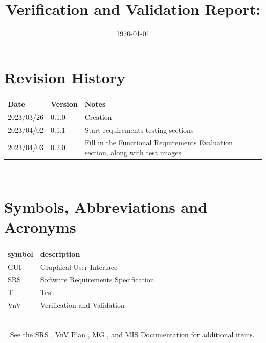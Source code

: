 \documentclass[12pt, titlepage]{article}
\begin{document}
\title{Verification and Validation Report: \progname} 
\author{\authname}
\date{\today}
	
\maketitle


\section{Revision History}

\begin{tabularx}{\textwidth}{p{3cm}p{2cm}X}
\toprule {\bf Date} & {\bf Version} & {\bf Notes}\\
\midrule
2023/03/26 & 0.1.0 & Creation\\
2023/04/02 & 0.1.1 & Start requirements testing sections\\
2023/04/03 & 0.2.0 & Fill in the Functional Requirements Evaluation
  section, along with test images\\
\bottomrule
\end{tabularx}

~\newpage

\section{Symbols, Abbreviations and Acronyms}

\renewcommand{\arraystretch}{1.2}
\begin{tabular}{l l} 
  \toprule		
  \textbf{symbol} & \textbf{description}\\
  \midrule 
  GUI & Graphical User Interface\\
  SRS & Software Requirements Specification\\
  T & Test\\
  VnV & Verification and Validation\\
  \bottomrule
\end{tabular}\\

~\newline
\noindent See the SRS \cite{SRS}, VnV Plan \cite{VnV_plan}, MG \cite{MG},
and MIS \cite{MIS} Documentation for additional items.

\newpage

\tableofcontents

\listoftables %

\listoffigures %
\end{document}
